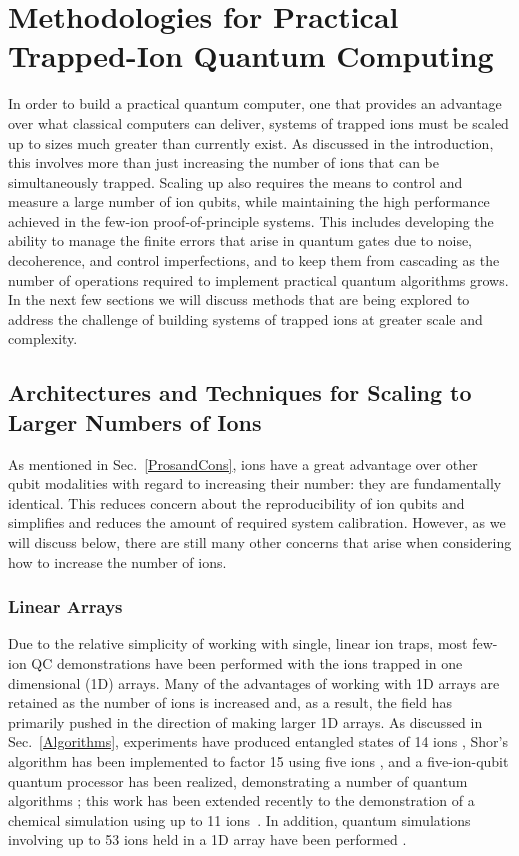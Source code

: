 \documentclass[%
reprint,
 amsmath,amssymb,
]{revtex4-1}
\begin{document}
\section{Methodologies for Practical Trapped-Ion Quantum Computing}
\label{PracticalQC}
In order to build a practical quantum computer, one that provides an advantage over what classical computers can deliver, systems of trapped ions must be scaled up to sizes much greater than currently exist.  As discussed in the introduction, this involves more than just increasing the number of ions that can be simultaneously trapped. Scaling up also requires the means to control and measure a large number of ion qubits, while maintaining the high performance achieved in the few-ion proof-of-principle systems.  This includes developing the ability to manage the finite errors that arise in quantum gates due to noise, decoherence, and control imperfections, and to keep them from cascading as the number of operations required to implement practical quantum algorithms grows.  In the next few sections we will discuss methods that are being explored to address the challenge of building systems of trapped ions at greater scale and complexity.

\subsection{Architectures and Techniques for Scaling to Larger Numbers of Ions}
\label{ScalingMethods}
As mentioned in Sec.~\ref{ProsandCons}, ions have a great advantage over other qubit modalities with regard to increasing their number: they are fundamentally identical.  This reduces concern about the reproducibility of ion qubits and simplifies and reduces the amount of required system calibration.  However, as we will discuss below, there are still many other concerns that arise when considering how to increase the number of ions.
    \subsubsection{Linear Arrays}
    \label{LinearArrays}
Due to the relative simplicity of working with single, linear ion traps, most few-ion QC demonstrations have been performed with the ions trapped in one dimensional (1D) arrays.  Many of the advantages of working with 1D arrays are retained as the number of ions is increased and, as a result, the field has primarily pushed in the direction of making larger 1D arrays. As discussed in Sec.~\ref{Algorithms}, experiments have produced entangled states of 14 ions \cite{Monz14IonEntanglement2011}, Shor's algorithm has been implemented to factor 15 using five ions \cite{MonzScalableShor2016}, and a five-ion-qubit quantum processor has been realized, demonstrating a number of quantum algorithms \cite{Debnath5QubitComp2016,FiggattGroverSearch2017}; this work has been extended recently to the demonstration of a chemical simulation using up to 11 ions~\cite{NamWaterMolecule2019}.  In addition, quantum simulations involving up to 53 ions held in a 1D array have been performed \cite{Zhang53IonSim2017}.
\end{document}

